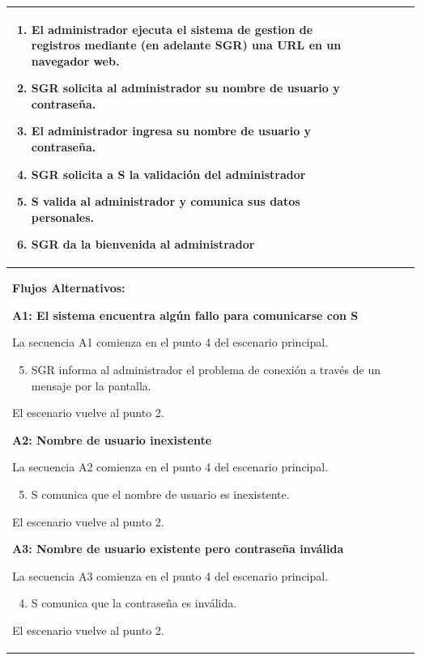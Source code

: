 \begin{longtable}{|l|p{5.5cm}|l|p{2cm}|l|p{1.9cm}|}
{					\begin{enumerate}
							\item El administrador ejecuta el sistema de gestion de registros mediante (en adelante SGR) una URL en un navegador web.
							\item SGR solicita al administrador su nombre de usuario y contraseña.
							\item El administrador ingresa su nombre de usuario y contraseña.
							\item SGR solicita a S la validación del administrador
							\item S valida al administrador y comunica sus datos personales.
							\item SGR da la bienvenida al administrador
					\end{enumerate}

					} \\ \hline

					\multicolumn{6}{|p{15cm}|}{ \textbf{Flujos Alternativos: }

					\textbf{A1: El sistema encuentra algún fallo para comunicarse con S}
					
					La secuencia A1 comienza en el punto 4 del escenario principal.
					\begin{enumerate}
							\setcounter{enumi}{4}
							\item SGR informa al administrador el problema de conexión a través de un mensaje por la pantalla.
					\end{enumerate}

					El escenario vuelve al punto 2.

					\textbf{A2: Nombre de usuario inexistente}
					
					La secuencia A2 comienza en el punto 4 del escenario principal.
					\begin{enumerate}
							\setcounter{enumi}{4}
							\item S comunica que el nombre de usuario es inexistente.
					\end{enumerate}

					El escenario vuelve al punto 2.

					\textbf{A3: Nombre de usuario existente pero contraseña inválida}
					
					La secuencia A3 comienza en el punto 4 del escenario principal.
					\begin{enumerate}
							\setcounter{enumi}{3}
							\item S comunica que la contraseña es inválida.
					\end{enumerate}

					El escenario vuelve al punto 2.

					} \\ \hline

			\end{longtable}

